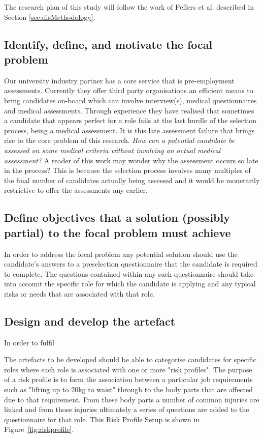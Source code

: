 The research plan of this study will follow the work of Peffers et al. described in Section \ref{sec:disMethodology}.

\subsection{Identify, define, and motivate the focal problem}

Our university industry partner has a core service that is pre-employment assessments.
Currently they offer third party organisations an efficient means to bring
candidates on-board which can involve interview(s), medical questionnaires and medical
assessments. Through experience they have realised that sometimes a candidate that appears
perfect for a role fails at the last hurdle of the selection process, being a medical assessment.
It is this late assessment failure that brings rise to the core problem of this research. \textit{How can
    a potential candidate be assessed on some medical criteria without involving an actual medical
    assessment?} A reader of this
work may wonder why the assessment occurs so late in the process? This is because the selection process
involves many multiples of the final number of candidates actually being assessed and it would be monetarily
restrictive to offer the assessments any earlier.


\subsection{Define objectives that a solution (possibly partial) to the focal problem must achieve}

In order to address the focal problem any potential solution should use the candidate's answers
to a preselection questionnaire that the candidate is required to complete. The questions contained
within any such questionnaire should take into account the specific role for which the candidate is applying
and any typical risks or needs that are associated with that role.

\subsection{Design and develop the artefact}

In order to fulfil


The artefacts to be developed should be able to categorise candidates for specific roles where each role is
associated with one or more "risk profiles". The purpose of a risk profile is to form the association between
a particular job requirements such as "lifting up to 20kg to waist" through to the body parts that are affected
due to that requirement. From these body parts a number of common injuries are linked and from those injuries
ultimately a series of questions are added to the questionnaire for that role. This Risk Profile Setup is shown
in Figure~\ref{fig:riskprofile}.



